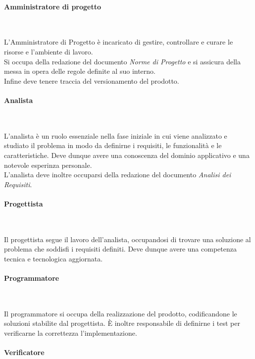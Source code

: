         \paragraph{Amministratore di progetto} ~

        L’Amministratore di Progetto è incaricato di gestire, controllare e curare le risorse e l'ambiente di lavoro.\\
        Si occupa della redazione del documento \textit{Norme di Progetto} e si assicura della messa in opera delle regole definite al suo interno.\\
        Infine deve tenere traccia del versionamento del prodotto.

        \paragraph{Analista} ~

        L'analista è un ruolo essenziale nella fase iniziale in cui viene analizzato e studiato il problema in modo da definirne i requisiti, le funzionalità e le caratteristiche. Deve dunque avere una conoscenza del dominio applicativo e una notevole esperinza personale.\\
        L'analista deve inoltre occuparsi della redazione del documento \textit{Analisi dei Requisiti}.

        \paragraph{Progettista} ~

        Il progettista segue il lavoro dell'analista, occupandosi di trovare una soluzione al problema che soddisfi i requisiti definiti. Deve dunque avere una competenza tecnica e tecnologica aggiornata.

        \paragraph{Programmatore} ~

        Il programmatore si occupa della realizzazione del prodotto, codificandone le soluzioni stabilite dal progettista.
        È inoltre responsabile di definirne i test per verificarne la correttezza l'implementazione.

        \paragraph{Verificatore} ~


